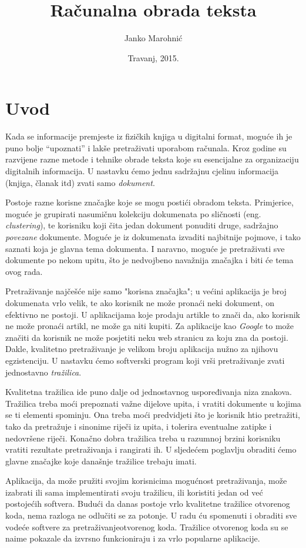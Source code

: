 \documentclass[a4paper,twoside,12pt]{scrreprt}
\title{Računalna obrada teksta}
\author{Janko Marohnić}
\date{Travanj, 2015.}
\begin{document}
\frontmatter

\chapter{Uvod}


Kada se informacije premjeste iz fizičkih knjiga u digitalni format, moguće ih je puno bolje ``upoznati'' i lakše pretraživati uporabom računala. Kroz godine su razvijene razne metode i tehnike obrade teksta koje su esencijalne za organizaciju digitalnih informacija. U nastavku ćemo jednu sadržajnu cjelinu informacija (knjiga, članak itd) zvati samo \textit{dokument}.

Postoje razne korisne značajke koje se mogu postići obradom teksta. Primjerice, moguće je grupirati nasumičnu kolekciju dokumenata po sličnosti (eng. \textit{clustering}), te korisniku koji čita jedan dokument ponuditi druge, sadržajno \textit{povezane} dokumente. Moguće je iz dokumenata izvaditi najbitnije pojmove, i tako saznati koja je glavna tema dokumenta. I naravno, moguće je pretraživati sve dokumente po nekom upitu, što je nedvojbeno navažnija značajka i biti će tema ovog rada.

Pretraživanje najčešće nije samo "korisna značajka"; u većini aplikacija je broj dokumenata vrlo velik, te ako korisnik ne može pronaći neki dokument, on efektivno ne postoji. U aplikacijama koje prodaju artikle to znači da, ako korisnik ne može pronaći artikl, ne može ga niti kupiti. Za aplikacije kao \textit{Google} to može značiti da korisnik ne može posjetiti neku web stranicu za koju zna da postoji. Dakle, kvalitetno pretraživanje je velikom broju aplikacija nužno za njihovu egzistenciju. U nastavku ćemo softverski program koji vrši pretraživanje zvati jednostavno \textit{tražilica}.

Kvalitetna tražilica ide puno dalje od jednostavnog uspoređivanja niza znakova. Tražilica treba moći prepoznati važne dijelove upita, i vratiti dokumente u kojima se ti elementi spominju. Ona treba moći predvidjeti što je korisnik htio pretražiti, tako da pretražuje i sinonime riječi iz upita, i tolerira eventualne zatipke i nedovršene riječi. Konačno dobra tražilica treba u razumnoj brzini korisniku vratiti rezultate pretraživanja i rangirati ih. U sljedećem poglavlju obraditi ćemo glavne značajke koje današnje tražilice trebaju imati.

Aplikacija, da može pružiti svojim korisnicima mogućnost pretraživanja, može izabrati ili sama implementirati svoju tražilicu, ili koristiti jedan od već postojećih softvera. Budući da danas postoje vrlo kvalitetne tražilice otvorenog koda, nema razloga ne odlučiti se za potonje. U radu ću spomenuti i obraditi sve vodeće softvere za pretraživanjeotvorenog koda. Tražilice otvorenog koda su se naime pokazale da izvrsno funkcioniraju i za vrlo popularne aplikacije.
\end{document}
